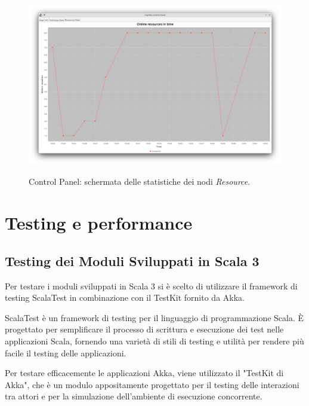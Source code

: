 \documentclass[12pt]{article}
\begin{document}
\begin{figure}[H]
    \caption{Control Panel: schermata delle statistiche dei nodi \textit{Resource}.}
    \includegraphics[width=\textwidth]{../assets/images/control-panel-resources-stats.png}
    \label{fig:control-panel-resources-stats}
\end{figure}

\newpage



\section{Testing e performance}

\subsection{Testing dei Moduli Sviluppati in Scala 3}

Per testare i moduli sviluppati in Scala 3 si è scelto di utilizzare il framework di testing ScalaTest in combinazione con il TestKit fornito da Akka.

ScalaTest è un framework di testing per il linguaggio di programmazione Scala. È progettato per semplificare il processo di scrittura e esecuzione dei test nelle applicazioni Scala, fornendo una varietà di stili di testing e utilità per rendere più facile il testing delle applicazioni.

Per testare efficacemente le applicazioni Akka, viene utilizzato il "TestKit di Akka", che è un modulo appositamente progettato per il testing delle interazioni tra attori e per la simulazione dell'ambiente di esecuzione concorrente.
\end{document}
